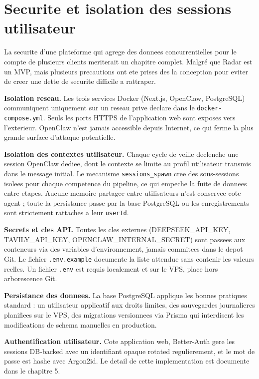 \documentclass[12pt,a4paper,openany]{report}
\begin{document}
\section{Securite et isolation des sessions utilisateur}
\label{sec:securite}

La securite d'une plateforme qui agrege des donnees concurrentielles pour le compte de plusieurs clients meriterait un chapitre complet. Malgré que Radar est un MVP, mais plusieurs precautions ont ete prises des la conception pour eviter de creer une dette de securite difficile a rattraper.

\textbf{Isolation reseau.} Les trois services Docker (Next.js, OpenClaw, PostgreSQL) communiquent uniquement sur un reseau prive declare dans le \texttt{docker-compose.yml}. Seuls les ports HTTPS de l'application web sont exposes vers l'exterieur. OpenClaw n'est jamais accessible depuis Internet, ce qui ferme la plus grande surface d'attaque potentielle.

\textbf{Isolation des contextes utilisateur.} Chaque cycle de veille declenche une session OpenClaw dediee, dont le contexte se limite au profil utilisateur transmis dans le message initial. Le mecanisme \texttt{sessions\_spawn} cree des sous-sessions isolees pour chaque competence du pipeline, ce qui empeche la fuite de donnees entre etapes. Aucune memoire partagee entre utilisateurs n'est conservee cote agent ; toute la persistance passe par la base PostgreSQL ou les enregistrements sont strictement rattaches a leur \texttt{userId}.

\textbf{Secrets et cles API.} Toutes les cles externes (DEEPSEEK\_API\_KEY, TAVILY\_API\_KEY, OPENCLAW\_INTERNAL\_SECRET) sont passees aux conteneurs via des variables d'environnement, jamais commitees dans le depot Git. Le fichier \texttt{.env.example} documente la liste attendue sans contenir les valeurs reelles. Un fichier \texttt{.env} est requis localement et sur le VPS, place hors arborescence Git.

\textbf{Persistance des donnees.} La base PostgreSQL applique les bonnes pratiques standard : un utilisateur applicatif aux droits limites, des sauvegardes journalieres planifiees sur le VPS, des migrations versionnees via Prisma qui interdisent les modifications de schema manuelles en production.

\textbf{Authentification utilisateur.} Cote application web, Better-Auth gere les sessions DB-backed avec un identifiant opaque rotated regulierement, et le mot de passe est hashe avec Argon2id. Le detail de cette implementation est documente dans le chapitre 5.
\end{document}
